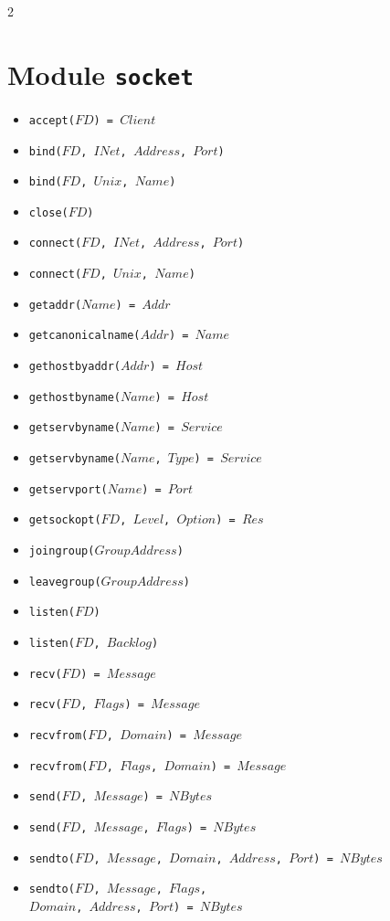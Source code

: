 \documentclass[10pt]{article}
\begin{document}
\begin{multicols}{2}
{\section*{Module \texttt{socket}}
\begin{scriptsize}
\begin{itemize}
    \item \texttt{accept($FD$) = $Client$}
    \item \texttt{bind($FD$, $INet$, $Address$, $Port$)}
    \item \texttt{bind($FD$, $Unix$, $Name$)}
    \item \texttt{close($FD$)}
    \item \texttt{connect($FD$, $INet$, $Address$, $Port$)}
    \item \texttt{connect($FD$, $Unix$, $Name$)}
    \item \texttt{getaddr($Name$) = $Addr$}
    \item \texttt{getcanonicalname($Addr$) = $Name$}
    \item \texttt{gethostbyaddr($Addr$) = $Host$}
    \item \texttt{gethostbyname($Name$) = $Host$}
    \item \texttt{getservbyname($Name$) = $Service$}
    \item \texttt{getservbyname($Name$, $Type$) = $Service$}
    \item \texttt{getservport($Name$) = $Port$}
    \item \texttt{getsockopt($FD$, $Level$, $Option$) = $Res$}
    \item \texttt{joingroup($GroupAddress$)}
    \item \texttt{leavegroup($GroupAddress$)}
    \item \texttt{listen($FD$)}
    \item \texttt{listen($FD$, $Backlog$)}
    \item \texttt{recv($FD$) = $Message$}
    \item \texttt{recv($FD$, $Flags$) = $Message$}
    \item \texttt{recvfrom($FD$, $Domain$) = $Message$}
    \item \texttt{recvfrom($FD$, $Flags$, $Domain$) = $Message$}
    \item \texttt{send($FD$, $Message$) = $NBytes$}
    \item \texttt{send($FD$, $Message$, $Flags$) = $NBytes$}
    \item \texttt{sendto($FD$, $Message$, $Domain$, $Address$, $Port$) = $NBytes$}
    \item \texttt{sendto($FD$, $Message$, $Flags$, \\        $Domain$, $Address$, $Port$) = $NBytes$}

\end{itemize}
\end{scriptsize}}
\end{multicols}
\end{document}
